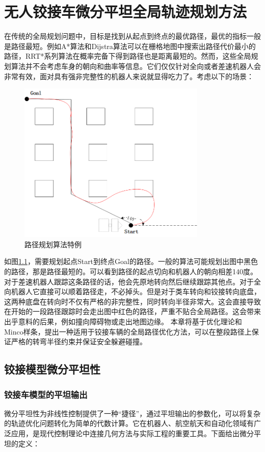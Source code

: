 \documentclass[master,academic]{ysuthesis} %
\begin{document}
	\chapter{无人铰接车微分平坦全局轨迹规划方法}
		在传统的全局规划问题中，目标是找到从起点到终点的最优路径，最优的指标一般是路径最短。例如A*算法和Dijstra算法可以在栅格地图中搜索出路径代价最小的路径，RRT*系列算法在概率完备下得到路径也是距离最短的。然而，这些全局规划算法并不会考虑车身的朝向和曲率等信息。它们仅仅针对全向或者差速机器人会非常有效，面对具有强非完整性的机器人来说就显得吃力了。考虑以下的场景：  
		\begin{figure}[!ht]
			\centering
			\includegraphics[width=0.8\textwidth]{路径规划算法特例.png}
			\caption{路径规划算法特例}
			\label{fig:路径规划算法特例}
		\end{figure}

		如图\ref{fig:路径规划算法特例}，需要规划起点Start到终点Goal的路径。一般的算法可能规划出图中黑色的路径，那是路径最短的。可以看到路径的起点切向和机器人的朝向相差140度。对于差速机器人跟踪这条路径的话，他会先原地转向然后继续跟踪其他点。对于全向机器人它直接可以顺着路径走，不必掉头。但是对于类车转向和铰接转向底盘，这两种底盘在转向时不仅有严格的非完整性，同时转向半径非常大。这会直接导致在开始的一段路径跟踪时会走出图中红色的路径，严重不贴合全局路径。这会带来出乎意料的后果，例如撞向障碍物或走出地图边缘。
		本章将基于优化理论和Minco样条，提出一种适用于铰接车辆的全局路径优化方法，可以在整段路径上保证严格的转弯半径约束并保证安全躲避碰撞。
		
	\section{铰接模型微分平坦性}
		\subsection{铰接车模型的平坦输出}
		微分平坦性为非线性控制提供了一种“捷径”，通过平坦输出的参数化，可以将复杂的轨迹优化问题转化为简单的代数计算。它在机器人、航空航天和自动化领域有广泛应用，是现代控制理论中连接几何方法与实际工程的重要工具。下面给出微分平坦的定义：
\end{document}
